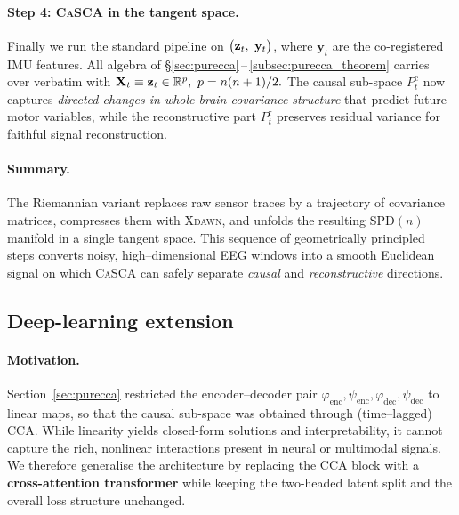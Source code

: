 \documentclass[14pt]{extarticle}
\begin{document}
	\paragraph{Step 4: \textsc{CaSCA} in the tangent space.}
	Finally we run the standard pipeline on
	$\bigl(\mathbf{z}_t,\ \mathbf y_t\bigr)$, where $\mathbf y_t$ are the
	co-registered IMU features.  All algebra of
	\S\ref{sec:purecca}\,–\,\ref{subsec:purecca_theorem} carries over
	verbatim with
	\(
	\mathbf{X}_t\equiv\mathbf{z}_t\in\mathbb{R}^{p},\ p=n(n+1)/2.
	\)
	The causal sub-space $P_t^{\mathrm c}$ now captures \emph{directed
		changes in whole-brain covariance structure} that predict future motor
	variables, while the reconstructive part $P_t^{\mathrm r}$ preserves
	residual variance for faithful signal reconstruction.
	
	\paragraph{Summary.}
	The Riemannian variant replaces raw sensor traces by a trajectory of covariance
	matrices, compresses them with \textsc{Xdawn}, and unfolds the resulting
	$\mathrm{SPD}(n)$ manifold in a single tangent space.
	This sequence of geometrically principled steps converts noisy,
	high–dimensional EEG windows into a smooth Euclidean signal on which
	\textsc{CaSCA} can safely separate \emph{causal} and
	\emph{reconstructive} directions.
	
	\subsection{Deep-learning extension}
	\label{sec:deepcca}
	
	\paragraph{Motivation.}
	Section~\ref{sec:purecca} restricted the encoder--decoder pair
	\(\varphi_{\text{enc}},\psi_{\text{enc}},\varphi_{\text{dec}},\psi_{\text{dec}}\)
	to linear maps, so that the causal sub-space was obtained through
	(time–lagged) CCA.
	While linearity yields closed-form solutions and interpretability, it
	cannot capture the rich, nonlinear interactions present in neural or
	multimodal signals.
	We therefore generalise the architecture by replacing the CCA block with
	a \textbf{cross-attention transformer} while keeping the two-headed
	latent split and the overall loss structure unchanged.
	
\end{document}
